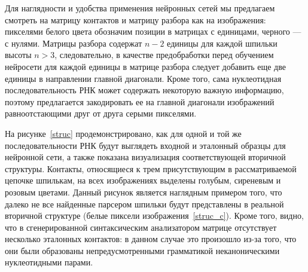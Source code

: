 Для наглядности и удобства применения нейронных сетей мы предлагаем смотреть на матрицу контактов и матрицу разбора как на изображения: пикселями белого цвета обозначим позиции в матрицах с единицами, черного --- с нулями. Матрицы разбора содержат $n - 2$ единицы для каждой шпильки высоты $n>3$, следовательно, в качестве предобработки перед обучением нейросети для каждой единицы в матрице разбора следует добавить еще две единицы в направлении главной диагонали. Кроме того, сама нуклеотидная последовательность РНК может содержать некоторую важную информацию, поэтому предлагается закодировать ее на главной диагонали изображений равноотстающими друг от друга серыми пикселями. 

На рисунке~\ref{struc} продемонстрировано, как для одной и той же последовательности РНК будут выглядеть входной и эталонный образцы для нейронной сети, а также показана визуализация соответствующей вторичной структуры. Контакты, относящиеся к трем присутствующим в рассматриваемой цепочке шпилькам, на всех изображениях выделены голубым, сиреневым и розовым цветами. Данный рисунок является наглядным примером того, что далеко не все найденные парсером шпильки будут представлены в реальной вторичной структуре (белые пиксели изображения~\ref{struc_c}). Кроме того, видно, что в сгенерированной синтаксическим анализатором матрице отсутствует несколько эталонных контактов: в данном случае это произошло из-за того, что они были образованы непредусмотренными грамматикой неканоническими нуклеотидными парами. 


